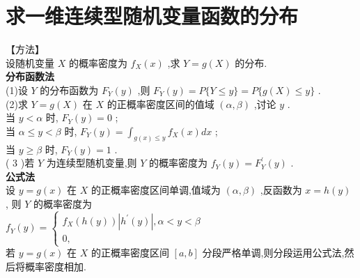 \documentclass[12pt, a4paper, oneside, UTF8]{ctexbook}
\begin{document}
\newpage

\section{求一维连续型随机变量函数的分布}
\begin{remark}
【方法】
\\设随机变量 \( X \) 的概率密度为 \( {f}_{X}\left( x\right) \) ,求 \( Y = g\left( X\right) \) 的分布. \\ 
\textbf{分布函数法} \\
(1)设 \( Y \) 的分布函数为 \( {F}_{Y}\left( y\right) \) ,则 \( {F}_{Y}\left( y\right)  = P\{ Y \leq  y\}  = P\{ g\left( X\right)  \leq  y\} \) . \\
(2)求 \( Y = g\left( X\right) \) 在 \( X \) 的正概率密度区间的值域 \( \left( {\alpha ,\beta }\right) \) ,讨论 \( y \) . \\
当 \( y < \alpha \) 时, \( {F}_{Y}\left( y\right)  = 0 \) ; \\
当 \( \alpha  \leq  y < \beta \) 时, \( {F}_{Y}\left( y\right)  = {\int }_{g\left( x\right)  \leq  y}{f}_{X}\left( x\right) {dx} \) ;\\
当 \( y \geq  \beta \) 时, \( {F}_{Y}\left( y\right)  = 1 \) . \\
( 3 )若 \( Y \) 为连续型随机变量,则 \( Y \) 的概率密度为 \( {f}_{Y}\left( y\right)  = {F}_{Y}^{\prime }\left( y\right) \) . \\
\textbf{公式法}\\
设 \( y = g\left( x\right) \) 在 \( X \) 的正概率密度区间单调,值域为 \( \left( {\alpha ,\beta }\right) \) ,反函数为 \( x = h\left( y\right) \) ,
则 \( Y \) 的概率密度为 \\
\( {f}_{Y}\left( y\right)  = \left\{  \begin{matrix} {f}_{X}\left( {h\left( y\right) }\right) \left| {{h}^{\prime }\left( y\right) }\right| ,\alpha  < y < \beta \\  0, \end{matrix}\right. \) \\
若 \( y = g\left( x\right) \) 在 \( X \) 的正概率密度区间 \( \left\lbrack  {a,b}\right\rbrack \) 分段严格单调,则分段运用公式法,然后将概率密度相加.
\end{remark}
\end{document}
